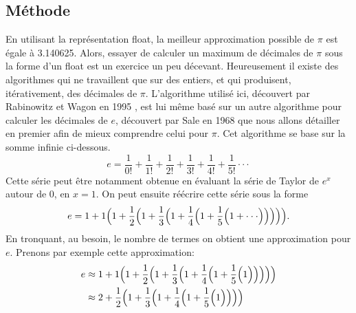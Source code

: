 \documentclass{article}
\begin{document}
\subsection{Méthode}
En utilisant la représentation float, la meilleur approximation possible de $\pi$ est égale à 3.140625. Alors, essayer de calculer un maximum de décimales de $\pi$ sous la forme d'un float est un exercice un peu décevant. Heureusement il existe des algorithmes qui ne travaillent que sur des entiers, et qui produisent, itérativement, des décimales de $\pi$. L'algorithme utilisé ici, découvert par Rabinowitz et Wagon en 1995 \cite{rabinowitz1995spigot}, est lui même basé sur un autre algorithme pour calculer les décimales de $e$, découvert par Sale en 1968 \cite{sale1968e} que nous allons détailler en premier afin de mieux comprendre celui pour $\pi$. Cet algorithme se base sur la somme infinie ci-dessous.
$$
e = \frac{1}{0!}+\frac{1}{1!}+\frac{1}{2!}+\frac{1}{3!}+\frac{1}{4!}+\frac{1}{5!}\cdot\cdot\cdot
$$
Cette série peut être notamment obtenue en évaluant la série de Taylor de $e^x$ autour de 0, en $x = 1$.
On peut ensuite réécrire cette série sous la forme
$$
e = 1+1\Bigl(1+\frac{1}{2}\Bigl(1+\frac{1}{3}\Bigl(1+\frac{1}{4}\Bigl(1+\frac{1}{5}\Bigl(1+\cdot\cdot\cdot\Bigr)\Bigr)\Bigr)\Bigr)\Bigr)
.$$
En tronquant, au besoin, le nombre de termes on obtient une approximation pour $e$.
Prenons par exemple cette approximation:
\begin{align*}  
e &\approx 1+1\Bigl(1+\frac{1}{2}\Bigl(1+\frac{1}{3}\Bigl(1+\frac{1}{4}\Bigl(1+\frac{1}{5}\Bigl(1\Bigr)\Bigr)\Bigr)\Bigr)\Bigr)\\
&\approx 2+\frac{1}{2}\Bigl(1+\frac{1}{3}\Bigl(1+\frac{1}{4}\Bigl(1+\frac{1}{5}\Bigl(1\Bigr)\Bigr)\Bigr)\Bigr)
\end{align*}
\end{document}
